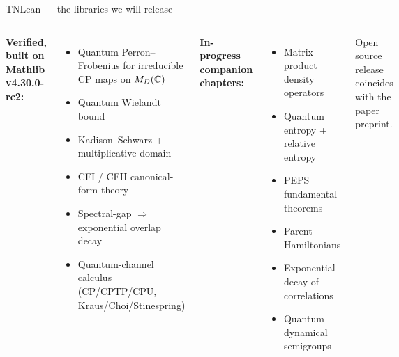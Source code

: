 \documentclass[aspectratio=169,10pt]{beamer}
\begin{document}
\begin{frame}{TNLean --- the libraries we will release}
    \begin{columns}[T]
        \textbf{Verified, built on Mathlib v4.30.0-rc2:}
        \begin{itemize}
            \item[\proved{}] Quantum Perron--Frobenius for irreducible CP maps on $M_D(\mathbb{C})$
            \item[\proved{}] Quantum Wielandt bound
            \item[\proved{}] Kadison--Schwarz + multiplicative domain
            \item[\proved{}] CFI / CFII canonical-form theory
            \item[\proved{}] Spectral-gap $\Rightarrow$ exponential overlap decay
            \item[\proved{}] Quantum-channel calculus (CP/CPTP/CPU, Kraus/Choi/Stinespring)
        \end{itemize}
        \textbf{In-progress companion chapters:}
        \begin{itemize}
            \item[\inprog{}] Matrix product density operators
            \item[\inprog{}] Quantum entropy + relative entropy
            \item[\inprog{}] PEPS fundamental theorems
            \item[\inprog{}] Parent Hamiltonians
            \item[\inprog{}] Exponential decay of correlations
            \item[\inprog{}] Quantum dynamical semigroups
        \end{itemize}
        \vspace{0.4em}
        \textcolor{dimwhite}{\footnotesize Open source release coincides with the paper preprint.}
    \end{columns}
\end{frame}
\end{document}
